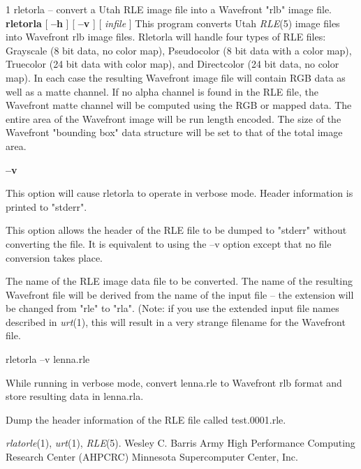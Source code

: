%
%
%
 1
rletorla -- convert a Utah RLE image file into a Wavefront "rlb" image file.
{\bf rletorla}
[
{\bf --h}
] [
{\bf --v}
] [
{\it infile}
]
This program converts Utah
{\it RLE}{\rm (5)}
image files into Wavefront rlb image files.  Rletorla will handle four types
of RLE files: Grayscale (8 bit data, no color map), Pseudocolor (8 bit data
with a color map), Truecolor (24 bit data with color map), and Directcolor (24
bit data, no color map).  In each case the resulting Wavefront image file will
contain RGB data as well as a matte channel.  If no alpha channel is found in
the RLE file, the Wavefront matte channel will be computed using the RGB or
mapped data.  The entire area of the Wavefront image will be run length encoded.
The size of the Wavefront "bounding box" data structure will be set to that of
the total image area.
\begin{TPlist}{{\bf --v}}
\item[{{\bf --v}}]
This option will cause rletorla to operate in verbose mode.  Header information
is printed to "stderr".
\item[{{\bf --h}}]
This option allows the header of the RLE file to be dumped to "stderr" without
converting the file.  It is equivalent to using the --v option except that no
file conversion takes place.
\item[{{\it infile}}]
The name of the RLE image data file to be converted.  The name of the resulting
Wavefront file will be derived from the name of the input file -- the extension
will be changed from "rle" to "rla".  (Note: if you use the extended
input file names described in
{\it urt}{\rm (1),}
this will result in a very strange filename for the Wavefront file.
\end{TPlist}
\begin{TPlist}{rletorla --v lenna.rle}
\item[{rletorla --v lenna.rle}]
While running in verbose mode, convert lenna.rle to Wavefront rlb format and
store resulting data in lenna.rla.
\item[{rletorla --h test.0001.rle}]
Dump the header information of the RLE file called test.0001.rle.
\end{TPlist}
{\it rlatorle}{\rm (1),}
{\it urt}{\rm (1),}
{\it RLE}{\rm (5).}
\nwl
Wesley C. Barris
\nwl
Army High Performance Computing Research Center (AHPCRC)
\nwl
Minnesota Supercomputer Center, Inc.
\newpage


